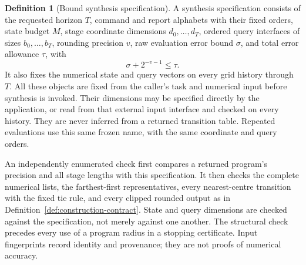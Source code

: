 \documentclass[11pt]{amsart}
\theoremstyle{definition}\newtheorem{definition}[theorem]{Definition}
\theoremstyle{remark}\newtheorem{remark}[theorem]{Remark}
\begin{document}
\begin{definition}[Bound synthesis specification]
\label{def:bound-request}
A synthesis specification consists of the requested horizon $T$, command
and report alphabets with their fixed orders, state budget $M$, stage
coordinate dimensions $d_0,\ldots,d_T$, ordered query interfaces of
sizes $b_0,\ldots,b_T$, rounding precision $v$, raw evaluation error
bound $\sigma$, and total error allowance $\tau$, with
\begin{equation}\label{eq:bound-rounding-budget}
 \sigma+2^{-v-1}\le\tau.
\end{equation}
It also fixes the numerical state and query vectors on every grid history
through $T$. All these objects are fixed from the caller's task and
numerical input before synthesis is invoked. Their dimensions may be
specified directly by the application, or read from that external input
interface and checked on every history. They are never inferred from a
returned transition table. Repeated evaluations use this same frozen
name, with the same coordinate and query orders.
\end{definition}

An independently enumerated check first compares a returned program's
precision and all stage lengths with this specification. It then checks
the complete numerical lists, the farthest-first representatives, every
nearest-centre transition with the fixed tie rule, and every clipped
rounded output as in Definition~\ref{def:construction-contract}.
State and query dimensions are checked against the specification, not
merely against one another. The structural check precedes every use of
a program radius in a stopping certificate. Input fingerprints record
identity and provenance; they are not proofs of numerical accuracy.
\end{document}
